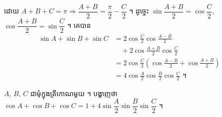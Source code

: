 ដោយ $A + B + C = \pi \Rightarrow \dfrac{A + B}{2} = \dfrac{\pi}{2} - \dfrac{C}{2}$ ។ ដូច្នេះ $\sin\dfrac{A + B}{2} = \cos\dfrac{C}{2}$, \ $\cos\dfrac{A + B}{2} = \sin\dfrac{C}{2}$ ។ គេបាន
\[
\begin{aligned}
\sin A + \sin B + \sin C &= 2\cos\frac{C}{2}\cos\frac{A - B}{2}\\
&\quad + 2\cos\frac{A + B}{2}\cos\frac{C}{2}\\
&= 2\cos\frac{C}{2}\left(\cos\frac{A - B}{2} + \cos\frac{A + B}{2}\right)\\
&= 4\cos\frac{A}{2}\cos\frac{B}{2}\cos\frac{C}{2} \text{ ។}
\end{aligned}
\]

\begin{pro}
$A$, $B$, $C$ ជាមុំក្នុងត្រីកោណមួយ ។ បង្ហាញថា $\cos A + \cos B + \cos C = 1 + 4\sin\dfrac{A}{2}\sin\dfrac{B}{2}\sin\dfrac{C}{2}$ ។
\end{pro}

